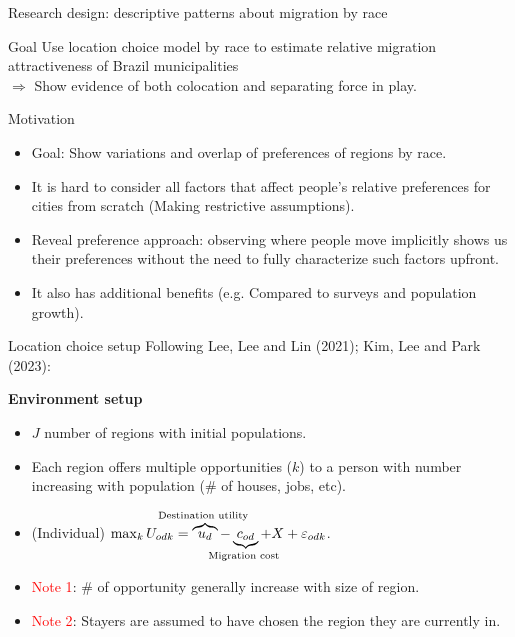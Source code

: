 \documentclass[aspectratio=169]{beamer}
\begin{document}
\begin{frame}{Research design: descriptive patterns about migration by race}


	\begin{alertblock}{Goal}
		Use location choice model by race to estimate relative migration attractiveness of Brazil municipalities \\ $\Rightarrow$ Show evidence of both colocation and separating force in play.
	\end{alertblock}

	\begin{block}{Motivation}
		\begin{itemize}
			\item Goal: Show variations and overlap of preferences of regions by race.
			\item It is hard to consider all factors that affect people's relative preferences for cities from scratch (Making restrictive assumptions).
			\item Reveal preference approach: observing where people move implicitly shows us their preferences without the need to fully characterize such factors upfront. 
			\item It also has additional benefits (e.g. Compared to surveys and population growth).
		\end{itemize}
	\end{block}
\end{frame}

\begin{frame}{Location choice setup}
	Following Lee, Lee and Lin (2021); Kim, Lee and Park (2023): \vspace{1em}

	\textbf{Environment setup}
	\begin{itemize}
		\item $J$ number of regions with initial populations. 
		\item Each region offers multiple opportunities ($k$) to a person with number increasing with population (\# of houses, jobs, etc). 
		\item (Individual) $\max_k U_{odk} = \overbrace{u_d}^{\text{\hidewidth Destination utility \hidewidth}} - \underbrace{c_{od}}_{\text{\hidewidth Migration cost \hidewidth}} + X + \varepsilon_{odk}$.
		\item \textcolor{red}{Note 1}: \# of opportunity generally increase with size of region.
		\item \textcolor{red}{Note 2}: Stayers are assumed to have chosen the region they are currently in.
	\end{itemize}
\end{frame}
\end{document}
